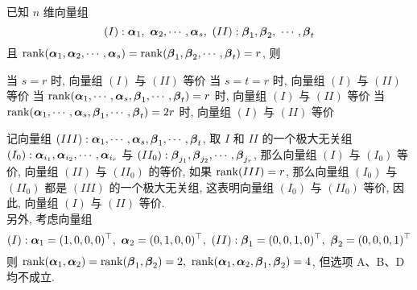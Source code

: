 \begin{example}
    已知 $n$ 维向量组 $$(I):\vb*{\alpha}_1,~\vb*{\alpha}_2,\cdots,\vb*{\alpha}_s,~(II): \vb*{\beta}_1,\vb*{\beta}_2,~\cdots,\vb*{\beta}_t$$
    且 $\rank(\vb*{\alpha}_1,\vb*{\alpha}_2,\cdots,\vb*{\alpha}_s)=\rank(\vb*{\beta}_1,\vb*{\beta}_2,\cdots,\vb*{\beta}_t)=r$, 则 
    \begin{tasks}
        \task 当 $s=r$ 时, 向量组 $(I)$ 与 $(II)$ 等价
        \task 当 $s=t=r$ 时, 向量组 $(I)$ 与 $(II)$ 等价
        \task 当 $\rank(\vb*{\alpha}_1,\cdots,\vb*{\alpha}_s,\vb*{\beta}_1,\cdots,\vb*{\beta}_t)=r$ 时, 向量组 $(I)$ 与 $(II)$ 等价
        \task 当 $\rank(\vb*{\alpha}_1,\cdots,\vb*{\alpha}_s,\vb*{\beta}_1,\cdots,\vb*{\beta}_t)=2r$ 时, 向量组 $(I)$ 与 $(II)$ 等价
    \end{tasks}
\end{example}
\begin{solution}
    记向量组 $(III):\vb*{\alpha}_1,\cdots,\vb*{\alpha}_s,\vb*{\beta}_1,\cdots,\vb*{\beta}_t$, 取 ${I}$ 和 ${II}$ 的一个极大无关组 $(I_0): \vb*{\alpha}_{i_1},\vb*{\alpha}_{i_2},\cdots,\vb*{\alpha}_{i_r}$ 与 $(II_0):\vb*{\beta}_{j_1},\vb*{\beta}_{j_2},\cdots,\vb*{\beta}_{j_r}$, 
    那么向量组 $(I)$ 与 $(I_0)$ 等价, 向量组 $(II)$ 与 $(II_0)$ 的等价, 如果 $\rank(III)=r$, 那么向量组 $(I_0)$ 与 $(II_0)$ 都是 $(III)$ 的一个极大无关组, 这表明向量组 $(I_0)$ 与 $(II_0)$ 等价, 因此, 向量组 $(I)$ 与 $(II)$ 等价.\\
    另外, 考虑向量组 $$(I):\vb*{\alpha}_1=(1,0,0,0)^\top,~\vb*{\alpha}_2=(0,1,0,0)^\top,~(II):\vb*{\beta}_1=(0,0,1,0)^\top,~\vb*{\beta}_2=(0,0,0,1)^\top$$
    则 $\rank(\vb*{\alpha}_1,\vb*{\alpha}_2)=\rank(\vb*{\beta}_1,\vb*{\beta}_2)=2,~\rank(\vb*{\alpha}_1,\vb*{\alpha}_2,\vb*{\beta}_1,\vb*{\beta}_2)=4$, 但选项 A、B、D 均不成立.
\end{solution}

